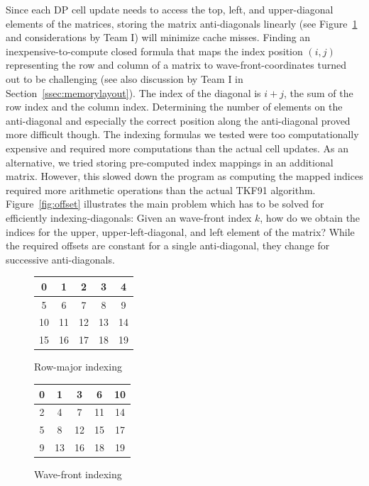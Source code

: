 \documentclass[runningheads,a4paper]{llncs}
\begin{document}
Since each DP cell update needs to access the top, left, and upper-diagonal elements of the matrices, 
storing the matrix anti-diagonals linearly (see Figure~\ref{fig:wavefront} and considerations by Team I) 
will minimize cache misses. 
Finding an inexpensive-to-compute closed formula that maps the index position $(i,j)$ representing the row and column of a matrix 
to wave-front-coordinates turned out to be challenging (see also discussion by Team I in Section~\ref{ssec:memorylayout}). 
The index of the diagonal is $i+j$, the sum of the row index and the column index. 
Determining the number of elements on the anti-diagonal and especially the correct position along the anti-diagonal proved more difficult though. 
The indexing formulas we tested were too computationally expensive and required more computations than the actual cell updates.
As an alternative, we tried storing pre-computed index mappings in an additional matrix. 
However, this slowed down the program as computing the mapped indices required more arithmetic operations than the actual TKF91 algorithm.
Figure~\ref{fig:offset} illustrates the main problem which has to be solved 
for efficiently indexing-diagonals: Given an wave-front index $k$, how do we obtain the indices for the upper, upper-left-diagonal, and left element of the matrix? 
While the required offsets are constant for a single anti-diagonal, they change for successive anti-diagonals.

\begin{figure}

\begin{minipage}{0.5\textwidth}
\centering
\begin{tabular}{|c|c|c|c|c|}
\hline 
0 & 1 & 2 & 3 & 4 \\ 
\hline 
5 & 6 & 7 & 8 & 9 \\ 
\hline 
10 & 11 & 12 & 13 & 14 \\ 
\hline 
15 & 16 & 17 & 18 & 19 \\ 
\hline
\end{tabular}
\caption{Row-major indexing}
\label{fig:rowmajor}
\end{minipage}
\begin{minipage}{0.5\textwidth}
\centering
\begin{tabular}{|c|c|c|c|c|}
\hline 
0 & 1 & 3 & 6 & 10 \\ 
\hline 
2 & 4 & 7 & 11 & 14 \\ 
\hline 
5 & 8 & 12 & 15 & 17 \\ 
\hline 
9 & 13 & 16 & 18 & 19 \\ 
\hline 
\end{tabular}
\caption{Wave-front indexing}
\label{fig:wavefront}
\end{minipage}
\end{figure}
\end{document}
